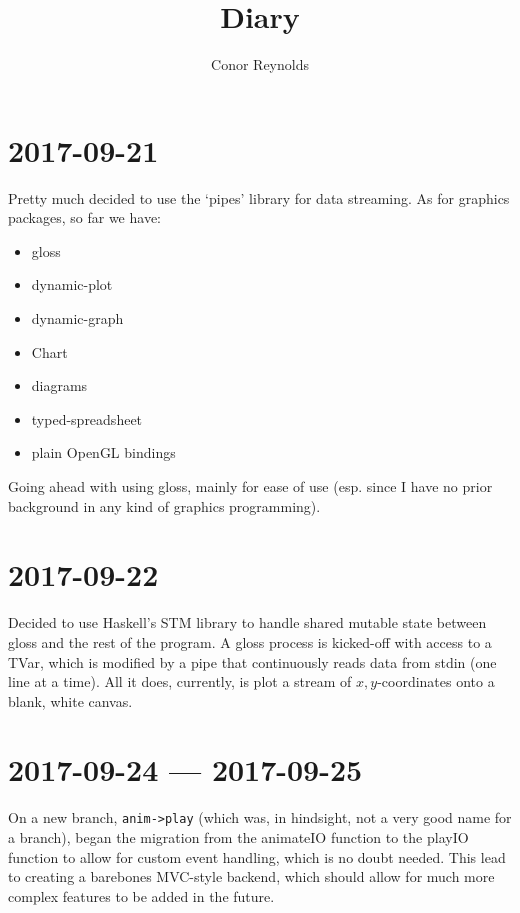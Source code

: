 \documentclass[a5paper,10pt]{article}
\title{Diary}
\author{Conor Reynolds}
\date{}
\begin{document}
    \maketitle

    \section*{2017-09-21}

    Pretty much decided to use the `pipes' library for data streaming. As for graphics packages, so far we have:

    \begin{itemize}
        \item gloss
        \item dynamic-plot
        \item dynamic-graph
        \item Chart
        \item diagrams
        \item typed-spreadsheet
        \item plain OpenGL bindings
    \end{itemize}

    Going ahead with using gloss, mainly for ease of use (esp. since I have no prior background in any kind of graphics programming).

    \section*{2017-09-22}

    Decided to use Haskell's STM library to handle shared mutable state between gloss and the rest of the program. A gloss process is kicked-off with access to a TVar, which is modified by a pipe that continuously reads data from stdin (one line at a time). All it does, currently, is plot a stream of $ x,y $-coordinates onto a blank, white canvas.

    \section*{2017-09-24 --- 2017-09-25}

    On a new branch, \verb|anim->play| (which was, in hindsight, not a very good name for a branch), began the migration from the animateIO function to the playIO function to allow for custom event handling, which is no doubt needed. This lead to creating a barebones MVC-style backend, which should allow for much more complex features to be added in the future.
\end{document}
